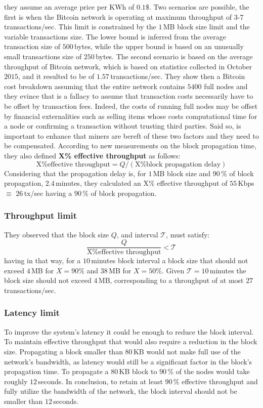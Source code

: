 \documentclass[USenglish]{uit-thesis}
\begin{document}
they assume an average price per KWh of $0.1\$$. Two scenarios are
possible, the first is when the Bitcoin network is operating at
maximum throughput of $3$-$7$\,transactions/sec. This
limit is constrained by the $1$\,MB block size limit and the
variable transactions size. The lower bound is inferred
from the average transaction size of $500$\,bytes, while the
upper bound is based on an unusually small transactions
size of $250$\,bytes. The second scenario is based on the
average throughput of Bitcoin network, which is based on
statistics collected in October $2015$, and it resulted to be
of $1.57$\,transactions/sec. They show then a Bitcoin cost
breakdown assuming that the entire network contains
$5400$ full nodes and they evince that is a fallacy to assume
that transaction costs necessarily have to be offset by
transaction fees. Indeed, the costs of running full nodes
may be offset by financial externalities such as selling items
whose costs computational time for a node or confirming a
transaction without trusting third parties. Said so, is important
to enhance that miners are bereft of these two factors and
they need to be compensated. According to new measurements
on the block propagation time, they also defined \textbf{X\% effective
throughput} as follows:
\[
\text{X\% effective throughput} = Q / (\text{X\% block propagation delay})
\]
Considering that the propagation delay is, for $1$\,MB block size and
$90$\,\% of block propagation, $2.4$\,minutes, they calculated
an X\% effective throughput of $55$\,Kbps $\equiv$ $26$\,tx/sec
having a $90$\,\% of block propagation.
\subsubsection{Throughput limit}
They observed that the block size $Q$, and interval $\mathcal{T}$,
must satisfy:
\[
\frac{Q}{\text{X\% effective throughput}} < \mathcal{T}
\]
having in that way, for a $10$\,minutes block interval a block size
that should not exceed $4$\,MB for $X=90\%$ and $38$\,MB for
$X=50\%$. Given $\mathcal{T} = 10$\,minutes the block size
should not exceed $4$\,MB, corresponding to a throughput
of at most $27$\,transactions/sec.
\subsubsection{Latency limit}
To improve the system's latency it could be enough
to reduce the block interval. To maintain effective
throughput that would also require a reduction in the
block size. Propagating a block smaller than $80$\,KB would
not make full use of the network's bandwidth, as latency would
still be a significant factor in the block's propagation time.
To propagate a $80$\,KB block to $90$\,\% of the nodes would
take roughly $12$\,seconds. In conclusion, to retain at least $90$\,\%
effective throughput and fully utilize the bandwidth of the network,
the block interval should not be smaller than $12$\,seconds.
\end{document}
